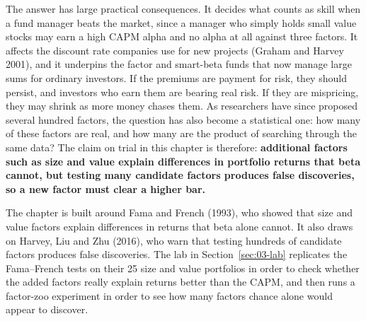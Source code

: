 The answer has large practical consequences. It decides what counts as skill when a fund manager beats the market, since a manager who simply holds small value stocks may earn a high CAPM alpha and no alpha at all against three factors. It affects the discount rate companies use for new projects (Graham and Harvey 2001), and it underpins the factor and smart-beta funds that now manage large sums for ordinary investors. If the premiums are payment for risk, they should persist, and investors who earn them are bearing real risk. If they are mispricing, they may shrink as more money chases them. As researchers have since proposed several hundred factors, the question has also become a statistical one: how many of these factors are real, and how many are the product of searching through the same data? The claim on trial in this chapter is therefore: \textbf{additional factors such as size and value explain differences in portfolio returns that beta cannot, but testing many candidate factors produces false discoveries, so a new factor must clear a higher bar.}

The chapter is built around Fama and French (1993), who showed that size and value factors explain differences in returns that beta alone cannot. It also draws on Harvey, Liu and Zhu (2016), who warn that testing hundreds of candidate factors produces false discoveries. The lab in Section~\ref{sec:03-lab} replicates the Fama--French tests on their 25 size and value portfolios in order to check whether the added factors really explain returns better than the CAPM, and then runs a factor-zoo experiment in order to see how many factors chance alone would appear to discover.

